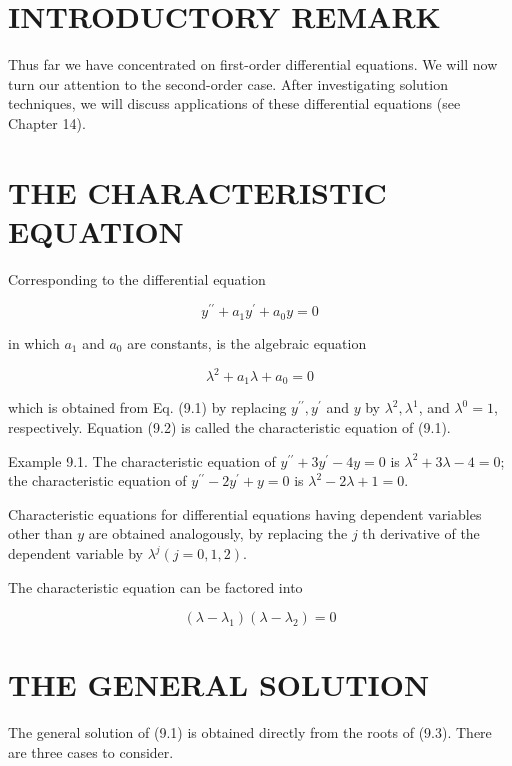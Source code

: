 \documentclass[10pt]{article}
\begin{document}
\section*{INTRODUCTORY REMARK}
Thus far we have concentrated on first-order differential equations. We will now turn our attention to the second-order case. After investigating solution techniques, we will discuss applications of these differential equations (see Chapter 14).

\section*{THE CHARACTERISTIC EQUATION}
Corresponding to the differential equation


\begin{equation*}
y^{\prime \prime}+a_{1} y^{\prime}+a_{0} y=0 \tag{9.1}
\end{equation*}


in which $a_{1}$ and $a_{0}$ are constants, is the algebraic equation


\begin{equation*}
\lambda^{2}+a_{1} \lambda+a_{0}=0 \tag{9.2}
\end{equation*}


which is obtained from Eq. (9.1) by replacing $y^{\prime \prime}, y^{\prime}$ and $y$ by $\lambda^{2}, \lambda^{1}$, and $\lambda^{0}=1$, respectively. Equation (9.2) is called the characteristic equation of (9.1).

Example 9.1. The characteristic equation of $y^{\prime \prime}+3 y^{\prime}-4 y=0$ is $\lambda^{2}+3 \lambda-4=0$; the characteristic equation of $y^{\prime \prime}-2 y^{\prime}+y=0$ is $\lambda^{2}-2 \lambda+1=0$.

Characteristic equations for differential equations having dependent variables other than $y$ are obtained analogously, by replacing the $j$ th derivative of the dependent variable by $\lambda^{j}(j=0,1,2)$.

The characteristic equation can be factored into


\begin{equation*}
\left(\lambda-\lambda_{1}\right)\left(\lambda-\lambda_{2}\right)=0 \tag{9.3}
\end{equation*}


\section*{THE GENERAL SOLUTION}
The general solution of (9.1) is obtained directly from the roots of (9.3). There are three cases to consider.
\end{document}
